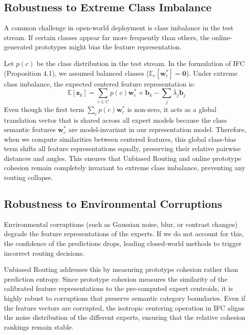 \documentclass{article}
\theoremstyle{plain}
\theoremstyle{definition}
\theoremstyle{remark}
\begin{document}
\subsection{Robustness to Extreme Class Imbalance}
A common challenge in open-world deployment is class imbalance in the test stream. If certain classes appear far more frequently than others, the online-generated prototypes might bias the feature representation. 

Let $p(c)$ be the class distribution in the test stream. In the formulation of IFC (Proposition 4.1), we assumed balanced classes ($\mathbb{E}_c[\mathbf{w}^*_c] = \mathbf{0}$). Under extreme class imbalance, the expected centered feature representation is:
\begin{equation}
    \mathbb{E}[\mathbf{z}_k] = \sum_{c \in C} p(c) \mathbf{w}^*_c + \mathbf{b}_k - \sum_j \bar{\lambda}_j \mathbf{b}_j
\end{equation}
Even though the first term $\sum_c p(c) \mathbf{w}^*_c$ is non-zero, it acts as a global translation vector that is shared across all expert models because the class semantic features $\mathbf{w}^*_c$ are model-invariant in our representation model. Therefore, when we compute similarities between centered features, this global class-bias term shifts all feature representations equally, preserving their relative pairwise distances and angles. This ensures that Unbiased Routing and online prototype cohesion remain completely invariant to extreme class imbalance, preventing any routing collapse.

\subsection{Robustness to Environmental Corruptions}
Environmental corruptions (such as Gaussian noise, blur, or contrast changes) degrade the feature representations of the experts. If we do not account for this, the confidence of the predictions drops, leading closed-world methods to trigger incorrect routing decisions.

Unbiased Routing addresses this by measuring prototype cohesion rather than prediction entropy. Since prototype cohesion measures the similarity of the calibrated feature representations to the pre-computed expert centroids, it is highly robust to corruptions that preserve semantic category boundaries. Even if the feature vectors are corrupted, the isotropic centering operation in IFC aligns the noise distribution of the different experts, ensuring that the relative cohesion rankings remain stable.
\end{document}
